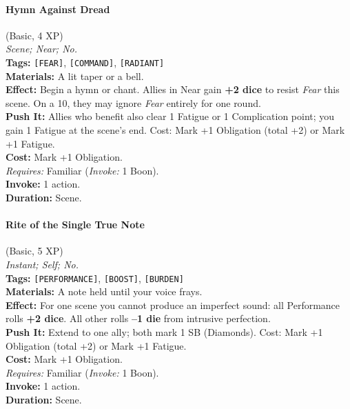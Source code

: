 \paragraph{Hymn Against Dread} (Basic, 4 XP) \hfill \\
\emph{Scene; Near; No.} \\
\textbf{Tags:} \texttt{[FEAR]}, \texttt{[COMMAND]}, \texttt{[RADIANT]} \\
\textbf{Materials:} A lit taper or a bell. \\
\textbf{Effect:} Begin a hymn or chant. Allies in Near gain \textbf{+2 dice} to resist \textit{Fear} this scene. On a 10, they may ignore \textit{Fear} entirely for one round. \\
\textbf{Push It:} Allies who benefit also clear 1 Fatigue or 1 Complication point; you gain 1 Fatigue at the scene's end. Cost: Mark +1 Obligation (total +2) or Mark +1 Fatigue. \\
\textbf{Cost:} Mark +1 Obligation. \\
\textit{Requires:} Familiar (\textit{Invoke:} 1 Boon). \\
\textbf{Invoke:} 1 action. \\
\textbf{Duration:} Scene.

\paragraph{Rite of the Single True Note} (Basic, 5 XP) \hfill \\
\emph{Instant; Self; No.} \\
\textbf{Tags:} \texttt{[PERFORMANCE]}, \texttt{[BOOST]}, \texttt{[BURDEN]} \\
\textbf{Materials:} A note held until your voice frays. \\
\textbf{Effect:} For one scene you cannot produce an imperfect sound: all Performance rolls \textbf{+2 dice}. All other rolls \textbf{--1 die} from intrusive perfection. \\
\textbf{Push It:} Extend to one ally; both mark 1 SB (Diamonds). Cost: Mark +1 Obligation (total +2) or Mark +1 Fatigue. \\
\textbf{Cost:} Mark +1 Obligation. \\
\textit{Requires:} Familiar (\textit{Invoke:} 1 Boon). \\
\textbf{Invoke:} 1 action. \\
\textbf{Duration:} Scene.

